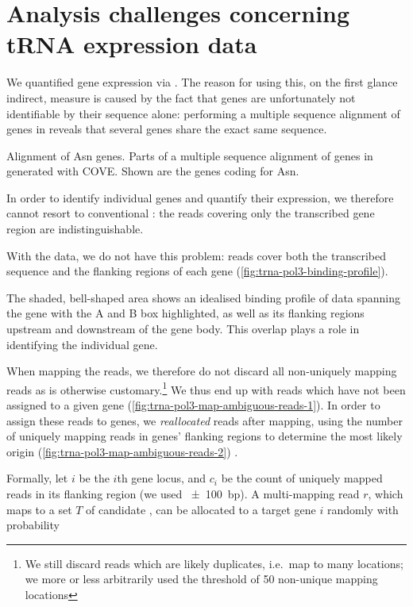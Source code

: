 \chapter{Analysis challenges concerning tRNA expression data}

We quantified \trna gene expression via  \chipseq. The reason for using
this, on the first glance indirect, measure is caused by the fact that \trna
genes are unfortunately not identifiable by their sequence alone: performing a
multiple sequence alignment of \trna genes in \mmu reveals that several \trna
genes share the exact same sequence.

    {{\footnotesize}}
    {Alignment of Asn \trna genes.}
    {Parts of a multiple sequence alignment of \trna genes in \mmu generated
    with COVE\@. Shown are the \trna genes coding for Asn.}

In order to identify individual \trna genes and quantify their expression, we
therefore cannot resort to conventional \rnaseq: the \rna reads covering only
the transcribed gene region are indistinguishable.

With the  \chipseq data, we do not have this problem: reads cover both the
transcribed sequence and the flanking regions of each gene
(\cref{fig:trna-pol3-binding-profile}).

    {The shaded, bell-shaped area shows an idealised binding profile of \chipseq
    data spanning the \trna gene with the A and B box highlighted, as well as
    its flanking regions upstream and downstream of the gene body. This overlap
    plays a role in identifying the individual gene.}

When mapping the reads, we therefore do not discard all non-uniquely mapping
reads as is otherwise customary.\footnote{We still discard reads which are
likely \pcr duplicates, i.e.\ map to many locations; we more or less arbitrarily
used the threshold of \num{50} non-unique mapping locations} We thus end up with
reads which have not been assigned to a given \trna gene
(\cref{fig:trna-pol3-map-ambiguous-reads-1}). In order to assign these reads to
\trna genes, we \emph{reallocated} reads after mapping, using the number of
uniquely mapping reads in \trna genes’ flanking regions to determine the most
likely origin (\cref{fig:trna-pol3-map-ambiguous-reads-2}) \citep{Kutter:2011}.

Formally, let \(i\) be the \(i\)th \trna gene locus, and \(c_i\) be the count of
uniquely mapped reads in its flanking region (we used \SI{\pm100}{bp}). A
multi-mapping read \(r\), which maps to a set \(T\) of candidate \trna[s], can
be allocated to a target \trna gene \(i\) randomly with probability

